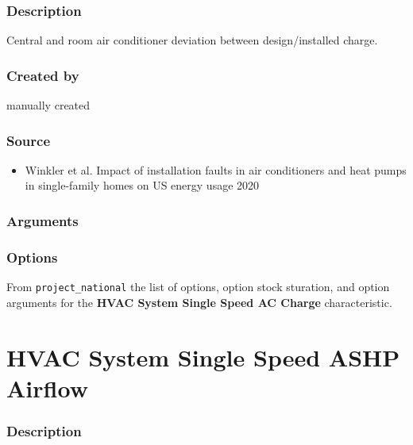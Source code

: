 \subsubsection{Description}\label{description-82}

Central and room air conditioner deviation between design/installed
charge.

\subsubsection{Created by}\label{created-by-82}

manually created

\subsubsection{Source}\label{source-81}

\begin{itemize}
 
\item
  Winkler et al. \textquotesingle Impact of installation faults in air
  conditioners and heat pumps in single-family homes on US energy
  usage\textquotesingle{} 2020
\end{itemize}

\subsubsection{Arguments}\label{arguments-51}



\subsubsection{Options}\label{options-82}

From \texttt{project\_national} the list of options, option stock
sturation, and option arguments for the \textbf{HVAC System Single Speed
AC Charge} characteristic.



\section{HVAC System Single Speed ASHP
Airflow}\label{hvac_system_single_speed_ashp_airflow}

\subsubsection{Description}\label{description-83}

